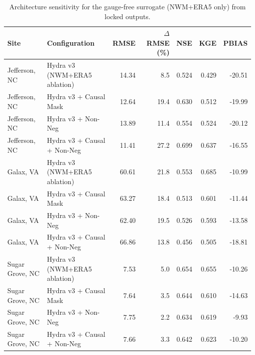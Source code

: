 \begin{table}
\centering
\caption{Architecture sensitivity for the gauge-free surrogate (NWM+ERA5 only) from locked outputs.}
\small
\begin{tabular}{ll r r r r r}
\toprule
\textbf{Site} & \textbf{Configuration} & \textbf{RMSE} & \textbf{$\Delta$RMSE (\%)} & \textbf{NSE} & \textbf{KGE} & \textbf{PBIAS} \\
\midrule
Jefferson, NC & Hydra v3 (NWM+ERA5 ablation) & 14.34 & 8.5 & 0.524 & 0.429 & -20.51 \\
Jefferson, NC & Hydra v3 + Causal Mask & 12.64 & 19.4 & 0.630 & 0.512 & -19.99 \\
Jefferson, NC & Hydra v3 + Non-Neg & 13.89 & 11.4 & 0.554 & 0.524 & -20.12 \\
Jefferson, NC & Hydra v3 + Causal + Non-Neg & 11.41 & 27.2 & 0.699 & 0.637 & -16.55 \\
Galax, VA & Hydra v3 (NWM+ERA5 ablation) & 60.61 & 21.8 & 0.553 & 0.685 & -10.99 \\
Galax, VA & Hydra v3 + Causal Mask & 63.27 & 18.4 & 0.513 & 0.601 & -11.44 \\
Galax, VA & Hydra v3 + Non-Neg & 62.40 & 19.5 & 0.526 & 0.593 & -13.58 \\
Galax, VA & Hydra v3 + Causal + Non-Neg & 66.86 & 13.8 & 0.456 & 0.505 & -18.81 \\
Sugar Grove, NC & Hydra v3 (NWM+ERA5 ablation) & 7.53 & 5.0 & 0.654 & 0.655 & -10.26 \\
Sugar Grove, NC & Hydra v3 + Causal Mask & 7.64 & 3.5 & 0.644 & 0.610 & -14.63 \\
Sugar Grove, NC & Hydra v3 + Non-Neg & 7.75 & 2.2 & 0.634 & 0.619 & -9.93 \\
Sugar Grove, NC & Hydra v3 + Causal + Non-Neg & 7.66 & 3.3 & 0.642 & 0.623 & -10.20 \\
\bottomrule
\end{tabular}
\label{tab:ablation_arch}
\end{table}
